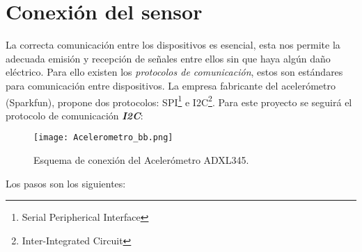 \documentclass[10pt, a4paper, twocolumn]{article} %
\begin{document}
\section{Conexión del sensor}

La correcta comunicación entre los dispositivos es esencial, esta nos permite la adecuada emisión y recepción de señales entre ellos sin que haya algún daño eléctrico. Para ello existen los \textit{protocolos de comunicación}, estos son estándares para comunicación entre dispositivos.
La empresa fabricante del acelerómetro (Sparkfun), propone dos protocolos: SPI\footnote{Serial Peripherical Interface} e I2C\footnote{Inter-Integrated Circuit}. Para este proyecto se seguirá el protocolo de comunicación \textit{\textbf{I2C}}:

\begin{figure}[h]
	\begin{center}
		\texttt{[image: Acelerometro\_bb.png]} 
		\caption{Esquema de conexión del Acelerómetro ADXL345.}
		\label{fg:conexion}
	\end{center}
\end{figure}

Los pasos son los siguientes:
\end{document}
